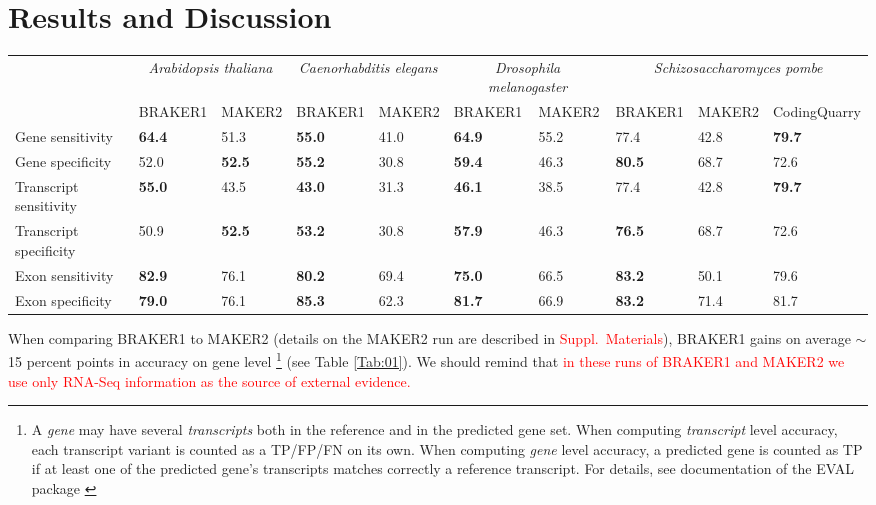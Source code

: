 \documentclass{bioinfo}
\begin{document}
\section{Results and Discussion}

\begin{table*}[!t]
{\begin{tabular}{lp{.9cm}p{.9cm}p{.9cm}p{.9cm}p{.9cm}p{.9cm}p{.9cm}p{.9cm}p{.9cm}}\hline
 & \multicolumn{2}{c}{\textit{Arabidopsis thaliana}} &  \multicolumn{2}{c}{\textit{Caenorhabditis elegans}} &  \multicolumn{2}{c}{\textit{Drosophila melanogaster}} &  \multicolumn{3}{c}{\textit{Schizosaccharomyces pombe}}\\
 & \tiny{BRAKER1} & \tiny{MAKER2} &  \tiny{BRAKER1} & \tiny{MAKER2}  & \tiny{BRAKER1} & \tiny{MAKER2} &\tiny{BRAKER1} & \tiny{MAKER2} &\tiny{CodingQuarry}\\
 \hline
Gene sensitivity        & \textbf{64.4} & 51.3          & \textbf{55.0} & 41.0 & \textbf{64.9} & 55.2 & 77.4 & 42.8 & \textbf{79.7}\\
Gene specificity        & 52.0          & \textbf{52.5} & \textbf{55.2} & 30.8 & \textbf{59.4} & 46.3 & \textbf{80.5} & 68.7 & 72.6\\
Transcript sensitivity  & \textbf{55.0} & 43.5          & \textbf{43.0} & 31.3 & \textbf{46.1} & 38.5 & 77.4 & 42.8 & \textbf{79.7}\\
Transcript specificity  & 50.9          & \textbf{52.5} & \textbf{53.2} & 30.8 & \textbf{57.9} & 46.3 & \textbf{76.5} & 68.7 & 72.6\\
Exon sensitivity        & \textbf{82.9} & 76.1          & \textbf{80.2} & 69.4 & \textbf{75.0} & 66.5 & \textbf{83.2} & 50.1 & 79.6\\
Exon specificity        & \textbf{79.0} & 76.1          & \textbf{85.3} & 62.3 & \textbf{81.7} & 66.9 & \textbf{83.2} & 71.4 & 81.7\\
\hline
\end{tabular}}{}
\end{table*}

When comparing BRAKER1 to MAKER2 (details on the MAKER2 run are described in \textcolor{red}{Suppl.~Materials}), BRAKER1 gains on average $\sim$15 percent points in accuracy on gene level
\footnote{A \textit{gene} may have several \textit{transcripts} both in the reference and in the predicted gene set. When computing \textit{transcript} level accuracy, each transcript variant is counted as a TP/FP/FN on its own. When computing \textit{gene} level accuracy, a predicted gene is counted as TP if at least one of the predicted gene's transcripts matches correctly a reference transcript. For details, see documentation of the EVAL package \citep{Eval}} 
(see Table \ref{Tab:01}).
We should remind that \textcolor{red}{in these runs of BRAKER1 and MAKER2 we use only RNA-Seq information as the source of external evidence.}
\end{document}
